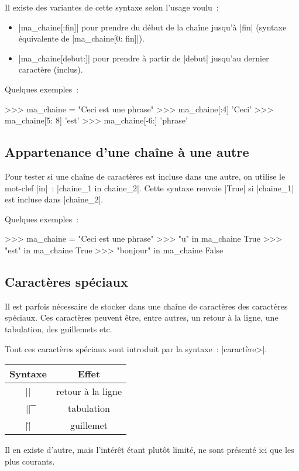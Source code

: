 		Il existe des variantes de cette syntaxe selon l'usage voulu~:
		\begin{itemize}
			\item \python|ma_chaine[:fin]| pour prendre du début de la chaîne jusqu'à \python|fin| (syntaxe équivalente de \python|ma_chaine[0: fin]|).
			\item \python|ma_chaine[debut:]| pour prendre à partir de \python|debut| jusqu'au dernier caractère (inclus).
		\end{itemize}
		
		Quelques exemples~:
		\begin{pythoncode}
			>>> ma_chaine = "Ceci est une phrase"
			>>> ma_chaine[:4]
			'Ceci'
			>>> ma_chaine[5: 8]
			'est'
			>>> ma_chaine[-6:]
			'phrase'
		\end{pythoncode}
	
	\subsection{Appartenance d'une chaîne à une autre}
		
		Pour tester si une chaîne de caractères est incluse dans une autre, on utilise le mot-clef \python|in|~: \python|chaine_1 in chaine_2|.
		Cette syntaxe renvoie \python|True| si \python|chaine_1| est incluse dans \python|chaine_2|.
		
		Quelques exemples~:
		
		\begin{pythoncode}
			>>> ma_chaine = "Ceci est une phrase"
			>>> "u" in ma_chaine
			True
			>>> "est" in ma_chaine
			True
			>>> "bonjour" in ma_chaine
			False
		\end{pythoncode}
	
	\subsection{Caractères spéciaux}
		
		Il est parfois nécessaire de stocker dans une chaîne de caractères des caractères spéciaux. Ces caractères peuvent être, entre autres, un retour à la ligne, une tabulation, des guillemets etc.
		
		Tout ces caractères spéciaux sont introduit par la syntaxe~: \python|\<caractère>|. \\
		\begin{tabular}{|c|c|} \hline
			Syntaxe & Effet \\ \hline \hline
			\python|\n| & retour à la ligne \\ \hline
			\python|\t| & tabulation \\ \hline
			\python|\"| & guillemet \\ \hline
		\end{tabular}
		Il en existe d'autre, mais l'intérêt étant plutôt limité, ne sont présenté ici que les plus courants.
		
